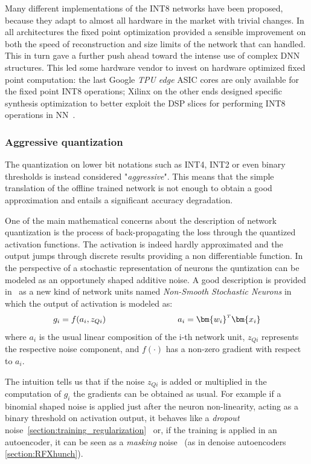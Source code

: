 Many different implementations of the INT8 networks have been proposed, because they adapt to almost all hardware in the market with trivial changes. In all architectures the fixed point optimization provided a sensible improvement on both the speed of reconstruction and size limits of the network that can handled. This in turn gave a further push ahead toward the intense use of complex DNN structures.
This led some hardware vendor to invest on hardware optimized fixed point computation: the last Google \textit{TPU edge} ASIC cores are only available for the fixed point INT8 operations; Xilinx on the other ends designed specific synthesis optimization to better exploit the DSP slices for performing INT8 operations in NN~\cite{xilinx_INT8_DNN}.


\subsubsection{Aggressive quantization}

The quantization on lower bit notations such as INT4, INT2 or even binary thresholds is instead considered "\textit{aggressive}". 
This means that the simple translation of the offline trained network is not enough to obtain a good approximation and entails a significant accuracy degradation.

One of the main mathematical concerns about the description of network quantization is the process of back-propagating the loss through the quantized activation functions. The activation is indeed hardly approximated and the output jumps through discrete results providing a non differentiable function. In the perspective of a stochastic representation of neurons the quntization can be modeled as an opportunely shaped additive noise. A good description is provided in~\cite{bengio2013estimating} as a new kind of network units named \textit{Non-Smooth Stochastic Neurons} in which the output of activation is modeled as:
\begin{equation}
    g_i = f(a_i, z_{Qi})  \hspace{3cm}  a_i = \transpose{\bm{w_i}}\bm{x_i}
    \label{eq:qnn_noise}
\end{equation}
where $a_i$ is the usual linear composition of the i-th network unit, $z_{Qi}$ represents the respective noise component, and $f(\cdot)$ has a non-zero gradient with respect to $a_i$.

The intuition tells us that if the noise $z_{Qi}$ is added or multiplied in the computation of $g_i$ the gradients can be obtained as usual. 
For example if a binomial shaped noise is applied just after the neuron non-linearity, acting as a binary threshold on activation output, it behaves like a \textit{dropout} noise~\cref{section:training_regularization}~\cite{Srivastava:2014:DSW:2627435.2670313} or, if the training is applied in an autoencoder, it can be seen as a \textit{masking} noise~\cite{vincent_et_al_denoise2008} (as in denoise autoencoders \cref{section:RFXhunch}).

